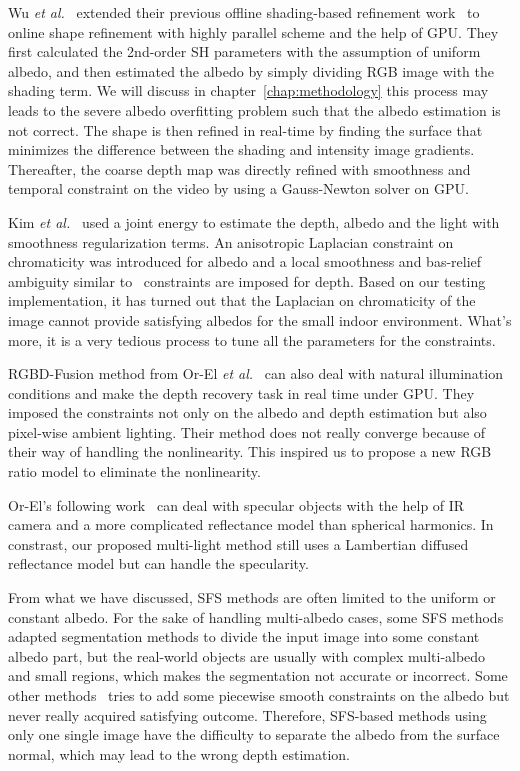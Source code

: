 Wu \emph{et al.}~\cite{wu2014real} extended their previous offline shading-based refinement work~\cite{wu2011shading} to online shape refinement with highly parallel scheme and the help of GPU. 
They first calculated the 2nd-order SH parameters with the assumption of uniform albedo, and then estimated the albedo by simply dividing RGB image with the shading term.
We will discuss in chapter~\ref{chap:methodology} this process may leads to the severe albedo overfitting problem such that the albedo estimation is not correct.
The shape is then refined in real-time by finding the surface that minimizes the difference between the shading and intensity image gradients.
Thereafter, the coarse depth map was directly refined with smoothness and temporal constraint on the video by using a Gauss-Newton solver on GPU.

Kim \emph{et al.}~\cite{kim2015joint} used a joint energy to estimate the depth, albedo and the light with smoothness regularization terms.
An anisotropic Laplacian constraint on chromaticity was introduced for albedo and a local smoothness and bas-relief ambiguity similar to~\cite{barron2013intrinsic} constraints are imposed for depth.
Based on our testing implementation, it has turned out that the Laplacian on chromaticity of the image cannot provide satisfying albedos for the small indoor environment.
What's more, it is a very tedious process to tune all the parameters for the constraints.

RGBD-Fusion method from Or-El \emph{et al.}~\cite{or2015rgbd} can also deal with natural illumination conditions and make the depth recovery task in real time under GPU. 
They imposed the constraints not only on the albedo and depth estimation but also pixel-wise ambient lighting.
Their method does not really converge because of their way of handling the nonlinearity.
This inspired us to propose a new RGB ratio model to eliminate the nonlinearity. 


Or-El's following work~\cite{or2016real} can deal with specular objects with the help of IR camera and a more complicated reflectance model than spherical harmonics. 
In constrast, our proposed multi-light method still uses a Lambertian diffused reflectance model but can handle the specularity.

From what we have discussed, SFS methods are often limited to the uniform or constant albedo. 
For the sake of handling multi-albedo cases, some SFS methods~\cite{han2013high, yu2013shading} adapted segmentation methods to divide the input image into some constant albedo part, but the real-world objects are usually with complex multi-albedo and small regions, which makes the segmentation not accurate or incorrect.  
Some other methods~\cite{wu2014real,kim2015joint,or2015rgbd,or2016real} tries to add some piecewise smooth constraints on the albedo but never really acquired satisfying outcome.
Therefore, SFS-based methods using only one single image have the difficulty to separate the albedo from the surface normal, which may lead to the wrong depth estimation.

